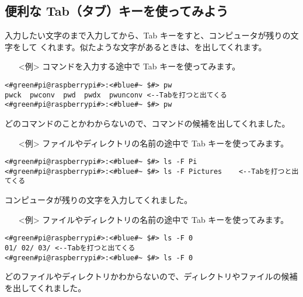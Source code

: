 \subsection{便利な Tab（タブ）キーを使ってみよう}
入力したい文字のまで入力してから、Tab キーをすと、コンピュータが残りの文字をして
くれます。似たような文字があるときは、を出してくれます。
\begin{itemize}
\item[<例>]コマンドを入力する途中で Tab キーを使ってみます。
\end{itemize}
\begin{lstlisting}[caption=Tabの例1, label=Tab1]
<#green#pi@raspberrypi#>:<#blue#~ $#> pw
pwck  pwconv  pwd  pwdx  pwunconv <--Tabを打つと出てくる
<#green#pi@raspberrypi#>:<#blue#~ $#> pw
\end{lstlisting}
どのコマンドのことかわからないので、コマンドの候補を出してくれました。
\begin{itemize}
\item[<例>]ファイルやディレクトリの名前の途中で Tab キーを使ってみます。
\end{itemize}
\begin{lstlisting}[caption=Tabの例2, label=Tab2]
<#green#pi@raspberrypi#>:<#blue#~ $#> ls -F Pi
<#green#pi@raspberrypi#>:<#blue#~ $#> ls -F Pictures	<--Tabを打つと出てくる
\end{lstlisting}
コンピュータが残りの文字を入力してくれました。
\begin{itemize}
\item[<例>]ファイルやディレクトリの名前の途中で Tab キーを使ってみます。
\end{itemize}
\begin{lstlisting}[caption=Tabの例3, label=Tab3]
<#green#pi@raspberrypi#>:<#blue#~ $#> ls -F 0
01/	02/	03/	<--Tabを打つと出てくる
<#green#pi@raspberrypi#>:<#blue#~ $#> ls -F 0
\end{lstlisting}
どのファイルやディレクトリかわからないので、ディレクトリやファイルの候補を出してくれました。

\begin{figure}[b]
\begin{tcolorbox}[title=\useOmetoi]
\begin{enumerate}
\end{enumerate}
\end{tcolorbox}
\end{figure}

